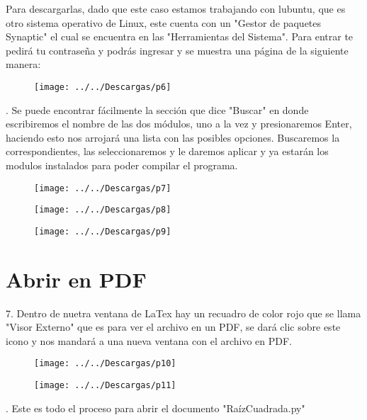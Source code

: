\documentclass[letter,12pt]{article}
\begin{document}
Para descargarlas, dado que este caso estamos trabajando con lubuntu, que es otro sistema operativo de Linux, este cuenta con un "Gestor de paquetes Synaptic" el cual se encuentra en las "Herramientas del Sistema".
Para entrar te pedirá tu contraseña y podrás ingresar y se muestra una página de la siguiente manera:

\begin{figure}[h]
	\centering
	\texttt{[image: ../../Descargas/p6]}
	\caption{}
	\label{fig:p6}
\end{figure}
. Se puede encontrar fácilmente la sección que dice "Buscar" en donde escribiremos el nombre de las dos módulos, uno a la vez y presionaremos Enter, haciendo esto nos arrojará una lista con las posibles opciones.
Buscaremos la correspondientes, las seleccionaremos y le daremos aplicar y ya estarán los modulos instalados para poder compilar el programa.

\begin{figure}[h]
	\centering
	\texttt{[image: ../../Descargas/p7]}
	\caption{}
	\label{fig:p7}
\end{figure}

\begin{figure}[h]
	\centering
	\texttt{[image: ../../Descargas/p8]}
	\caption{}
	\label{fig:p8}
\end{figure}
\newpage
\begin{figure}[h]
	\centering
	\texttt{[image: ../../Descargas/p9]}
	\caption{}
	\label{fig:p9}
\end{figure}
\newpage
\section*{Abrir en PDF}
7. Dentro de nuetra ventana de LaTex hay un recuadro de color rojo que se llama "Visor Externo" que es para ver el archivo en un PDF, se dará clic sobre este icono y nos mandará a una nueva ventana con el archivo en PDF.

\begin{figure}[h]
	\centering
	\texttt{[image: ../../Descargas/p10]}
	\caption{}
	\label{fig:p10}
\end{figure}

\begin{figure}[h]
	\centering
	\texttt{[image: ../../Descargas/p11]}
	\caption{}
	\label{fig:p11}
\end{figure}
. Este es todo el proceso para abrir el documento "RaízCuadrada.py"
\end{document}
